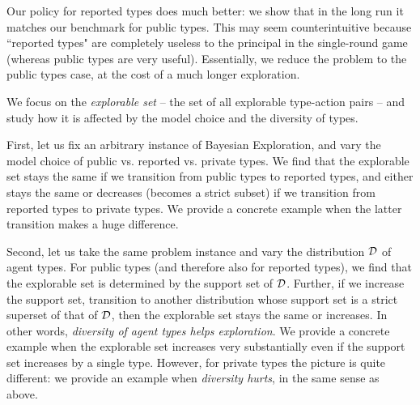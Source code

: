 Our policy for reported types does much better: we show that in the long run it matches our benchmark for public types. This may seem counterintuitive because ``reported types" are completely useless to the principal in the single-round game (whereas public types are very useful). Essentially, we reduce the problem to the public types case, at the cost of a much longer exploration.

We focus on the \emph{explorable set} -- the set of all explorable type-action pairs -- and study how  it is affected by the model choice and the diversity of types. 

First, let us fix an arbitrary instance of Bayesian Exploration, and vary the model choice of public vs. reported vs. private types. We find that the explorable set stays the same if we transition from public types to reported types, and either stays the same or decreases (becomes a strict subset) if we transition from reported types to private types. We provide a concrete example when the latter transition makes a huge difference. 

Second, let us take the same problem instance and vary the distribution $\mathcal{D}$ of agent types. For public types (and therefore also for reported types), we find that the explorable set is determined by the support set of $\mathcal{D}$. Further, if we increase the support set, \ie transition to another distribution whose support set is a strict superset of that of $\mathcal{D}$, then the explorable set stays the same or increases. In other words, \emph{diversity of agent types helps exploration}. We provide a concrete example when the explorable set increases very substantially even if the support set increases by a single type. However, for private types the picture is quite different: we provide an example when \emph{diversity hurts}, in the same sense as above. 